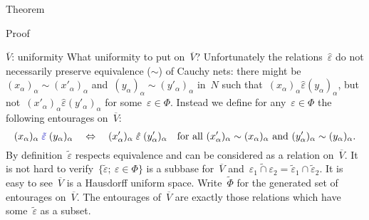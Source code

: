\documentclass[b]{subfiles}
\begin{document}
\begin{parsec}
\begin{point}{Theorem}
\begin{point}{Proof}
\begin{point}{$\overline{V}$: uniformity}
What uniformity to put on~$\overline{V}$?
Unfortunately the relations~$\hat\varepsilon$ do not necessarily preserve
equivalence ($\sim$) of Cauchy nets:
    there might be~$(x_\alpha)_\alpha \sim (x'_\alpha)_\alpha$
    and~$(y_\alpha)_\alpha \sim (y'_\alpha)_\alpha$ in~$N$
such that~$(x_\alpha)_\alpha \mathrel{\hat\varepsilon} (y_\alpha)_\alpha$,
but not~$(x'_\alpha)_\alpha \mathrel{\hat\varepsilon} (y'_\alpha)_\alpha$
for some~$\varepsilon \in \Phi$.
Instead we define for any~$\varepsilon \in \Phi$
the following entourages on~$\overline{V}$:
\begin{equation*}
    (x_\alpha)_\alpha \mathrel{\Define{\tilde\varepsilon}\index{epsi@$\tilde\varepsilon$}}
    (y_\alpha)_\alpha \quad\Leftrightarrow\quad
    (x'_\alpha)_\alpha \mathrel{\hat\varepsilon}
    (y'_\alpha)_\alpha \quad
    \text{for all
        $(x'_\alpha)_\alpha \sim (x_\alpha)_\alpha$ 
    and $(y'_\alpha)_\alpha \sim (y_\alpha)_\alpha$.}
\end{equation*}
By definition~$\tilde\varepsilon$
respects equivalence and can be considered as a relation on~$\overline{V}$.
It is not hard to verify~$\{ \tilde\varepsilon ;\ \varepsilon \in \Phi\}$
is a subbase for~$\overline{V}$
and~$\widetilde{\varepsilon_1 \cap \varepsilon_2} = \tilde{\varepsilon}_1
\cap \tilde{\varepsilon}_2$.
It is easy to see~$\overline{V}$ is a Hausdorff uniform space.
Write~$\tilde\Phi$ for the generated set of entourages on~$\overline{V}$.
The entourages of~$\overline{V}$ are exactly those relations
    which have some~$\tilde\varepsilon$
    as a subset.


\end{point}
\end{point}
\end{point}
\end{parsec}
\end{document}
